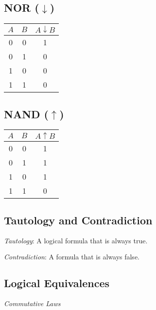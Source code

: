\begin{multicols}{2}
	\vspace{1em}

	\subsection*{NOR (\(\downarrow\))}

	\begin{tabular}{ccc}
		\toprule
		\(A\) & \(B\) & \(A \downarrow B\) \\
		\midrule
		0   & 0   & 1                \\
		0   & 1   & 0                \\
		1   & 0   & 0                \\
		1   & 1   & 0                \\
		\bottomrule
	\end{tabular}

	\vspace{1em}

	\subsection*{NAND (\(\uparrow\))}

	\begin{tabular}{ccc}
		\toprule
		\(A\) & \(B\) & \(A \uparrow B\) \\
		\midrule
		0   & 0   & 1              \\
		0   & 1   & 1              \\
		1   & 0   & 1              \\
		1   & 1   & 0              \\
		\bottomrule
	\end{tabular}

\end{multicols}
\medskip

\subsection{Tautology and Contradiction}

\emph{Tautology}: A logical formula that is always true.

\emph{Contradiction}: A formula that is always false.

\subsection{Logical Equivalences}

\emph{Commutative Laws}

